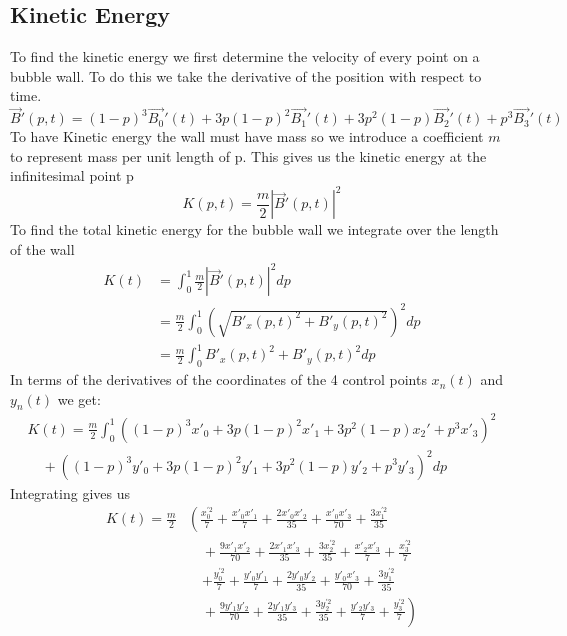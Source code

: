 \documentclass{article}
\begin{document}
\subsection{Kinetic Energy}
To find the kinetic energy we first determine the velocity of every point on a
bubble wall. To do this we take the derivative of the position with respect to
time.
\begin{displaymath}
\vec{B}'(p,t)=(1-p)^3\vec{B_0}'(t)+3p(1-p)^2\vec{B_1}'(t)+3p^2(1-p)\vec{B_2}'(t)+p^3\vec{B_3}'(t)
\end{displaymath}
To have Kinetic energy the wall must have mass so we introduce a coefficient
$m$ to represent mass per unit length of p. This gives us the kinetic energy at the
infinitesimal point p
\begin{displaymath}
K(p,t) = \frac{m}{2} \left|\vec{B}'(p,t)\right|^2
\end{displaymath}
To find the total kinetic energy for the bubble wall we integrate over the
length of the wall
\begin{align*}
K(t)&= \int_0^1 \frac{m}{2} \left|\vec{B}'(p,t)\right|^2 dp\\
&=\frac{m}{2} \int_0^1 \left(\sqrt{B'_x(p,t)^2+B'_y(p,t)^2}\right)^2 dp\\
&=\frac{m}{2} \int_0^1 B'_x(p,t)^2+B'_y(p,t)^2 dp
\end{align*}
In terms of the derivatives of the coordinates of the 4 control points $x_n(t)$
and $y_n(t)$ we get:
\begin{align*}
K(t)=\frac{m}{2} \int_0^1
\left((1-p)^3x'_0+3p(1-p)^2x'_1+3p^2(1-p)x_2'+p^3x'_3\right)^2 \\
 \quad+ \left((1-p)^3y'_0+3p(1-p)^2y'_1+3p^2(1-p)y'_2+p^3y'_3
\right)^2 dp
\end{align*}
Integrating gives us
\begin{align*}
K(t)=\frac{m}{2} &\left( 
\frac{x_0^{'2}}{7} + \frac{x'_0 x'_1}{7} + \frac{2 x'_0 x'_2}{35} + 
\frac{x'_0 x'_3}{70}  + \frac{3 x_1^{'2}}{35} \right.\\
&\left.\quad +\frac{9 x'_1 x'_2}{70} 
+ \frac{2 x'_1 x'_3}{35} + \frac{3 x_2^{'2}}{35} + \frac{x'_2 x'_3}{7} +\frac{x_3^{'2}}{7}\right.\\
&\quad\left. +\frac{y_0^{'2}}{7} + \frac{y'_0 y'_1}{7} + \frac{2 y'_0 y'_2}{35} + 
\frac{y'_0 x'_3}{70} + \frac{3 y_1^{'2}}{35} \right.\\
&\left.\quad  +\frac{9 y'_1 y'_2}{70} 
+ \frac{2 y'_1 y'_3}{35} + \frac{3 y_2^{'2}}{35} + \frac{y'_2 y'_3}{7}
+\frac{y_3^{'2}}{7}\right)
\end{align*}
\end{document}
